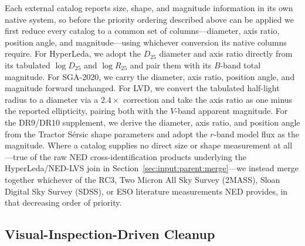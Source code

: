 \documentclass[modern,linenumbers]{aastex701}
\begin{document}
Each external catalog reports size, shape, and magnitude information in
its own native system, so before the priority ordering described above
can be applied we first reduce every catalog to a common set of columns---diameter,
axis ratio, position angle, and magnitude---using
whichever conversion its native columns require. For HyperLeda, we
adopt the $D_{25}$ diameter and axis ratio directly from its tabulated
$\log D_{25}$ and $\log R_{25}$ and pair them with its $B$-band total
magnitude. For SGA-2020, we carry the diameter, axis ratio, position
angle, and magnitude forward unchanged. For LVD, we convert the
tabulated half-light radius to a diameter via a $2.4\times$ correction
and take the axis ratio as one minus the reported ellipticity, pairing
both with the $V$-band apparent magnitude. For the DR9/DR10
supplement, we derive the diameter, axis ratio, and position angle from
the Tractor S\'ersic shape parameters and adopt the $r$-band model flux
as the magnitude. Where a catalog supplies no direct size or shape
measurement at all---true of the raw NED cross-identification products
underlying the HyperLeda/NED-LVS join in
Section~\ref{sec:input:parent:merge}---we instead merge together
whichever of the RC3, Two Micron All Sky Survey (2MASS), Sloan Digital
Sky Survey (SDSS), or ESO literature measurements NED provides, in that
decreasing order of priority.

\subsection{Visual-Inspection-Driven Cleanup}
\label{sec:parent:vicuts}
\end{document}

